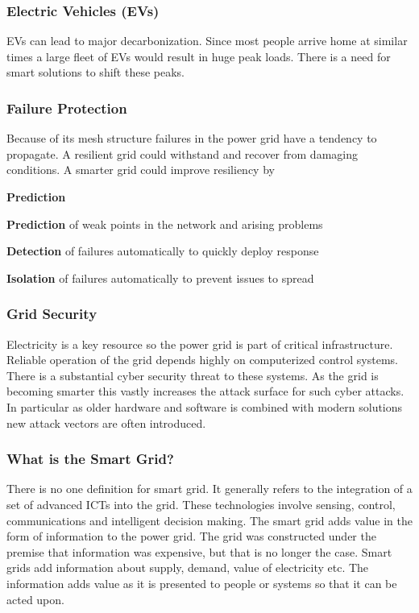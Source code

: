 \subsubsection{Electric Vehicles (EVs)}
EVs can lead to major decarbonization.
Since most people arrive home at similar times a large fleet of EVs would result in huge peak loads.
There is a need for smart solutions to shift these peaks.

\subsubsection{Failure Protection}
Because of its mesh structure failures in the power grid have a tendency to propagate.
A resilient grid could withstand and recover from damaging conditions.
A smarter grid could improve resiliency by
\begin{labeling}{\textbf{Prediction}}
    \item [\textbf{Prediction}] of weak points in the network and arising problems
    \item [\textbf{Detection}] of failures automatically to quickly deploy response
    \item [\textbf{Isolation}] of failures automatically to prevent issues to spread
\end{labeling}

\subsubsection{Grid Security}
Electricity is a key resource so the power grid is part of critical infrastructure.
Reliable operation of the grid depends highly on computerized control systems.
There is a substantial cyber security threat to these systems.
As the grid is becoming smarter this vastly increases the attack surface for such cyber attacks.
In particular as older hardware and software is combined with modern solutions new attack vectors are often introduced.

\subsubsection{What is the Smart Grid?}
There is no one definition for smart grid.
It generally refers to the integration of a set of advanced ICTs into the grid.
These technologies involve sensing, control, communications and intelligent decision making.
The smart grid adds value in the form of information to the power grid.
The grid was constructed under the premise that information was expensive, but that is no longer the case.
Smart grids add information about supply, demand, value of electricity etc.
The information adds value as it is presented to people or systems so that it can be acted upon.\\

